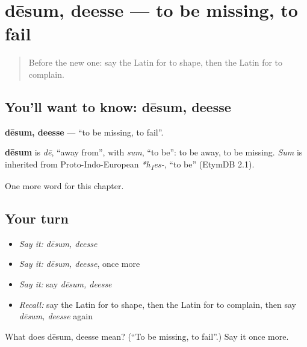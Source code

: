 \section[dēsum, deesse]{dēsum, deesse — to be missing, to fail}

\label{lesson:LA-C231-desum}



\begin{quote}
Before the new one: say the Latin for to shape, then the Latin for to complain.
\end{quote}

\subsection*{You'll want to know: dēsum, deesse}
\textbf{dēsum, deesse} — \textquotedblleft{}to be missing, to fail\textquotedblright{}.

\begin{cousinweb}
\textbf{dēsum} is \emph{dē}, \textquotedblleft{}away from\textquotedblright{}, with \emph{sum}, \textquotedblleft{}to be\textquotedblright{}: to be away, to be missing. \emph{Sum} is inherited from Proto-Indo-European \emph{*h\textsubscript{1}es-}, \textquotedblleft{}to be\textquotedblright{} (EtymDB 2.1).
\end{cousinweb}

\begin{grammarlens}[title={What you've built}]
One more word for this chapter.
\end{grammarlens}

\subsection*{Your turn}
\begin{itemize}
\raggedright
  \item \emph{Say it:} \emph{dēsum, deesse}
  \item \emph{Say it:} \emph{dēsum, deesse}, once more
  \item \emph{Say it:} say \emph{dēsum, deesse}
  \item \emph{Recall:} say the Latin for to shape, then the Latin for to complain, then say \emph{dēsum, deesse} again
\end{itemize}

\begin{tcolorbox}[breakable,colback=teal!4,colframe=teal!35!black,title={Before you move on}]
What does dēsum, deesse mean? (\textquotedblleft{}To be missing, to fail\textquotedblright{}.) Say it once more.
\end{tcolorbox}
